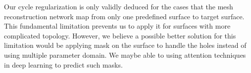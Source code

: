 Our cycle regularization is only validly deduced for the cases that the mesh reconstruction network map from only one predefined surface to target surface. This fundamental limitation prevents us to apply it for surfaces with more complicated topology. However, we believe a possible better solution for this limitation would be applying mask on the surface to handle the holes instead of using multiple parameter domain. We maybe able to using attention techniques in deep learning to predict such masks.